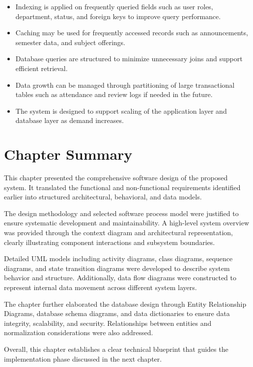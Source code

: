 \begin{itemize}
    \item Indexing is applied on frequently queried fields such as user roles, department, status, and foreign keys to improve query performance.
    \item Caching may be used for frequently accessed records such as announcements, semester data, and subject offerings.
    \item Database queries are structured to minimize unnecessary joins and support efficient retrieval.
    \item Data growth can be managed through partitioning of large transactional tables such as attendance and review logs if needed in the future.
    \item The system is designed to support scaling of the application layer and database layer as demand increases.
\end{itemize}


\section{Chapter Summary}

This chapter presented the comprehensive software design of the proposed system.
It translated the functional and non-functional requirements identified earlier
into structured architectural, behavioral, and data models.

The design methodology and selected software process model were justified to
ensure systematic development and maintainability. A high-level system overview
was provided through the context diagram and architectural representation,
clearly illustrating component interactions and subsystem boundaries.

Detailed UML models including activity diagrams, class diagrams, sequence diagrams,
and state transition diagrams were developed to describe system behavior and structure.
Additionally, data flow diagrams were constructed to represent internal data movement
across different system layers.

The chapter further elaborated the database design through Entity Relationship Diagrams,
database schema diagrams, and data dictionaries to ensure data integrity, scalability,
and security. Relationships between entities and normalization considerations were
also addressed.

Overall, this chapter establishes a clear technical blueprint that guides the
implementation phase discussed in the next chapter.
